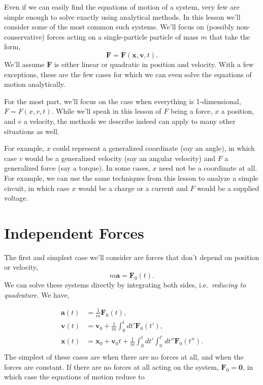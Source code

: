 \documentclass[
  letterpaper,
  DIV=11,
  numbers=noendperiod]{scrreprt}
\begin{document}
Even if we can easily find the equations of motion of a system, very few
are simple enough to solve exactly using analytical methods. In this
lesson we'll consider some of the most common such systems. We'll focus
on (possibly non-conservative) forces acting on a single-particle
particle of mass \(m\) that take the form, \[
\mathbf{F} = \mathbf{F}(\mathbf{x}, \mathbf{v}, t).
\] We'll assume \(\mathbf{F}\) is either linear or quadratic in position
and velocity. With a few exceptions, these are the few cases for which
we can even solve the equations of motion analytically.

For the most part, we'll focus on the case when everything is
1-dimensional, \(F = F(x, v, t)\). While we'll speak in this lesson of
\(F\) being a force, \(x\) a position, and \(v\) a velocity, the methods
we describe indeed can apply to many other situations as well.

For example, \(x\) could represent a generalized coordinate (say an
angle), in which case \(v\) would be a generalized velocity (say an
angular velocity) and \(F\) a generalized force (say a torque). In some
cases, \(x\) need not be a coordinate at all. For example, we can use
the same techniques from this lesson to analyze a simple circuit, in
which case \(x\) would be a charge or a current and \(F\) would be a
supplied voltage.

\hypertarget{independent-forces}{%
\section{Independent Forces}\label{independent-forces}}

The first and simplest case we'll consider are forces that don't depend
on position or velocity, \[
m \mathbf{a} = \mathbf{F}_0(t).
\] We can solve these systems directly by integrating both sides,
i.e.~\emph{reducing to quadrature}. We have,

\[
\begin{align*}
\mathbf{a}(t) &= \frac{1}{m}\mathbf{F}_0(t), \\
\mathbf{v}(t) &= \mathbf{v}_0 + \frac{1}{m}\int_0^t dt'\mathbf{F}_0(t'), \\
\mathbf{x}(t) &= \mathbf{x}_0 + \mathbf{v}_0t + \frac{1}{m}\int_0^t dt' \int_0^{t'} dt''\mathbf{F}_0(t''). \\
\end{align*}
\] The simplest of these cases are when there are no forces at all, and
when the forces are constant. If there are no forces at all acting on
the system, \(\mathbf{F}_0 = \mathbf{0}\), in which case the equations
of motion reduce to
\end{document}
